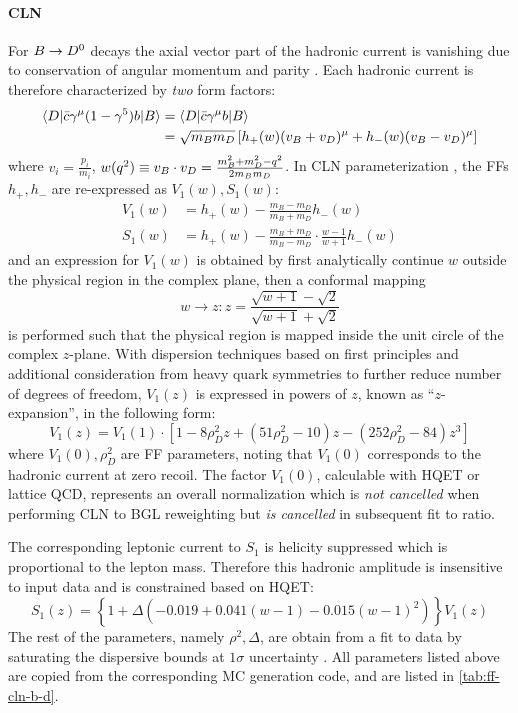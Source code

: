 \paragraph{CLN}
For $B \rightarrow {\ensuremath{{D}^0}}$ decays the axial vector part of the hadronic current is
vanishing due to conservation of angular momentum and parity
\cite{Bernlochner_2022}.
Each hadronic current is therefore characterized by \emph{two} form factors:
\begin{align}
    \langle D\rvert \bar{c} \gamma^\mu(1 - \gamma^5) b \lvert B\rangle &=
    \langle D\rvert \bar{c} \gamma^\mu b \lvert B\rangle
    \nonumber \\
    &=
    \sqrt{m_B m_D} \left[
        h_+(w)(v_B + v_D)^\mu + h_-(w)(v_B - v_D)^\mu
    \right]
\end{align}
where $v_i = \frac{p_i}{m_i}$,
$w(q^2) \equiv v_B \cdot v_D = \frac{m^2_B + m^2_D - q^2}{2 m_B m_D}$.
In CLN parameterization \cite{Caprini_1998},
the FFs $h_+, h_-$ are re-expressed as $V_1(w), S_1(w)$:
\begin{align}
    V_1(w) &= h_+(w) - \frac{m_B - m_D}{m_B + m_D} h_-(w) \\
    S_1(w) &= h_+(w) - \frac{m_B + m_D}{m_B - m_D} \cdot \frac{w-1}{w+1} h_-(w)
\end{align}
and an expression for $V_1(w)$ is obtained by first analytically continue $w$
outside the physical region in the complex plane, then a conformal mapping
\begin{equation}
    w \rightarrow z: z =
    \frac{\sqrt{w+1} - \sqrt{2}}{\sqrt{w+1} + \sqrt{2}}
\end{equation}
is performed such that the physical region is mapped inside the unit circle of
the complex $z$-plane.
With dispersion techniques based on first principles and additional
consideration from heavy quark symmetries to further reduce number of degrees of
freedom,
$V_1(z)$ is expressed in powers of $z$, known as ``$z$-expansion'', in the
following form:
\begin{equation}
    V_1(z) = V_1(1) \cdot \left[
        1 - 8 \rho^2_D z + (51 \rho^2_D - 10) z - (252 \rho^2_D - 84) z^3
    \right]
\end{equation}
where $V_1(0), \rho^2_D$ are FF parameters,
noting that $V_1(0)$ corresponds to the hadronic current at zero recoil.
The factor $V_1(0)$,
calculable with HQET or lattice QCD,
represents an overall normalization which is \emph{not cancelled} when
performing CLN to BGL reweighting but \emph{is cancelled} in subsequent fit to
\RD ratio.

The corresponding leptonic current to $S_1$ is helicity suppressed which is
proportional to the lepton mass.
Therefore this hadronic amplitude is insensitive to input data and is
constrained based on HQET:
\begin{equation}
    S_1(z) = \left\{
        1 + \Delta(-0.019 + 0.041(w - 1) - 0.015(w - 1)^2)
    \right\} V_1(z)
\end{equation}
The rest of the parameters,
namely $\rho^2, \Delta$,
are obtain from a fit to data by saturating the dispersive bounds at $1\sigma$
uncertainty \cite{Bernlochner_2022}.
All parameters listed above are copied from the corresponding MC generation
code,
and are listed in \cref{tab:ff-cln-b-d}.

